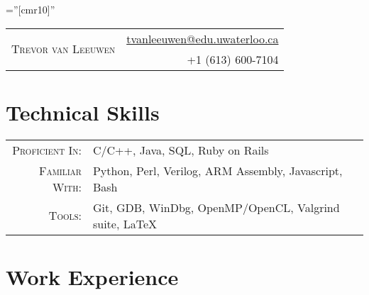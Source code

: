 \documentclass[a4paper,10pt]{article}
\begin{document}
\pagestyle{empty} %

\font\fb=''[cmr10]'' %

\par{
    \begin{tabular}{lr}

        \multirow{2}{12.9cm}{\Huge{\textsc{Trevor van Leeuwen}}} & \href{mailto:tvanleeuwen@edu.uwaterloo.ca}{tvanleeuwen@edu.uwaterloo.ca} \\
         & +1 (613) 600-7104
    \end{tabular}
\bigskip\par}

\section{Technical Skills}

\begin{tabular}{rl}
    \textsc{Proficient In:} & C/C++, Java, SQL, Ruby on Rails \\
    \textsc{Familiar With:} & Python, Perl, Verilog, ARM Assembly, Javascript, Bash \\
   	\textsc{Tools:} & Git, GDB, WinDbg, OpenMP/OpenCL, Valgrind suite, \LaTeX \\
\end{tabular}

\section{Work Experience}


\end{document}

